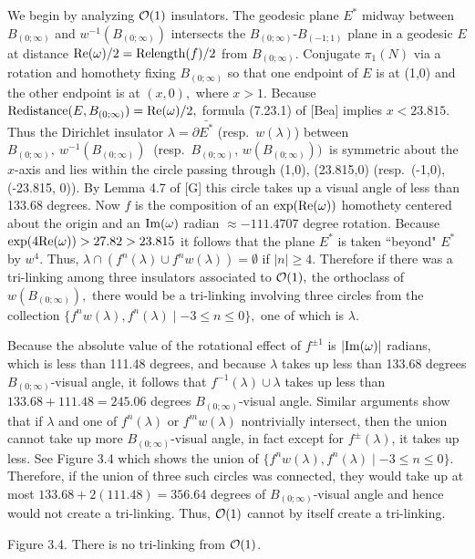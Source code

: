 We begin by analyzing ${\cal O}(1)$ insulators.
   The geodesic plane $E^*$ midway between $ B_{(0;\infty)}$ and
$w^{-1}( B_{(0;\infty)})$ intersects the $ B_{(0;\infty)}$-$ B_{(-1;1)}$ plane in a geodesic $E$ at distance  ${\rm Re}(\omega)/2 = {\rm Relength}(f)/2$
from $B_{(0;\infty)}.$  Conjugate $\pi_1(N)$ via a rotation and homothety fixing $B_{(0;\infty)}$ 
 so that one endpoint of $E$ is at (1,0) and the other endpoint is at $(x,0),$
where $x >1.$ Because ${\rm Redistance}(E, B_{(0;\infty)})={\rm Re}(\omega)/2,$ formula (7.23.1) of [Bea]
implies $x < 23.815.$ Thus the Dirichlet insulator
$\lambda = \partial \bar {E^*}$
 (resp.\ $w(\lambda)$) between $ B_{(0;\infty)},\ w^{-1}( B_{(0;\infty)})\ $ (resp.\ $ B_{(0;\infty)}$, 
$w(B_{(0;\infty)}))\ $ is symmetric about the $x$-axis and lies within the circle passing through (1,0),
(23.815,0)  (resp.\ (-1,0), (-23.815, 0)).  
By  Lemma 4.7 of [G] this circle takes up a
visual angle of less than 133.68 degrees.  
Now $f$ is the composition of an
$\exp({\rm Re}(\omega))$ homothety centered about the origin and an ${\rm Im}(\omega)$ radian $\approx
-111.4707$ degree rotation. Because $\exp(4 {\rm Re}(\omega)) > 27.82 > 23.815$ it follows that the plane $E^*$ is taken ``beyond" $E^*$ by $w^4.$  Thus,
 $\lambda\cap (f^n(\lambda)\cup f^nw(\lambda))=\emptyset$ if $|n| \ge 4.$
Therefore if there was a
tri-linking among three insulators associated to ${\cal O}(1),$
the orthoclass of $w(B_{(0;\infty)}),$ there would be a tri-linking involving three circles from the collection 
$\{f^nw(\lambda),  f^n(\lambda)\mid -3\le n\le 0\},$ one of which is $\lambda.$

Because the absolute value of the rotational effect of $f^{\pm 1}$ is $|{\rm Im}(\omega)|$ radians, which is less than 111.48 degrees,  and because 
$\lambda$ takes up less than 133.68 degrees $ B_{(0;\infty)}$-visual
angle, 
it follows that
$f^{-1}(\lambda)\cup\lambda$ takes up less than $133.68+111.48=245.06$
degrees $ B_{(0;\infty)}$-visual angle.  Similar arguments show that if $\lambda$ and one of $f^n(\lambda)$ or $f^mw(\lambda)$ 
nontrivially intersect, then the
union cannot take up more $ B_{(0;\infty)}$-visual angle, in fact except for
$f^\pm(\lambda)$, it takes up less. See Figure 3.4 which shows the union of
$\{f^nw(\lambda),  f^n(\lambda)\mid -3\le n\le 0\}.$   Therefore, if the union of
three such circles was connected,  they would take up at most
$133.68+2(111.48)=356.64$ degrees of $ B_{(0;\infty)}$-visual angle and hence would not create a
tri-linking. Thus, ${\cal O}(1)$ cannot by itself create a tri-linking.
\centerline{Figure 3.4. There is no tri-linking from ${\cal O}(1)$.}
\eject

